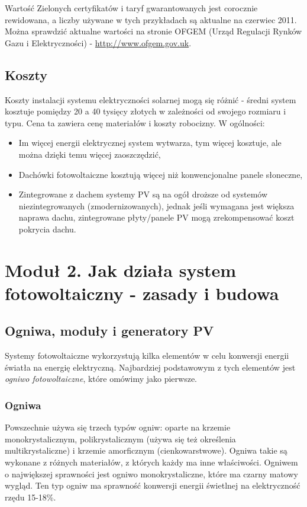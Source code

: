 \documentclass[12pt,a4paper]{article}
\begin{document}
Wartość Zielonych certyfikatów i taryf gwarantowanych jest corocznie 
rewidowana, a liczby używane w tych przykładach są aktualne na czerwiec 
2011. Można sprawdzić aktualne wartości na stronie OFGEM (Urząd 
Regulacji Rynków Gazu i Elektryczności) - \underline{http://www.ofgem.gov.uk}. 

\subsection{Koszty} 
Koszty instalacji systemu elektryczności solarnej mogą 
się różnić - średni system kosztuje pomiędzy 20 a 40 tysięcy złotych w 
zależności od swojego rozmiaru i typu. Cena ta zawiera cenę materiałów i 
koszty robocizny. W ogólności: 

\begin{itemize}
\item Im więcej energii elektrycznej system wytwarza, tym więcej 
kosztuje, ale można dzięki temu więcej zaoszczędzić, 
\item Dachówki fotowoltaiczne kosztują więcej niż konwencjonalne panele 
słoneczne, 
\item Zintegrowane z dachem systemy PV są na ogół droższe od systemów 
niezintegrowanych (zmodernizowanych), jednak jeśli wymagana jest większa naprawa dachu, zintegrowane płyty/panele PV mogą zrekompensować koszt pokrycia dachu.
\end{itemize}

\section{Moduł 2. Jak działa system fotowoltaiczny - zasady i budowa }
\subsection{Ogniwa, moduły i generatory PV}

Systemy fotowoltaiczne wykorzystują kilka elementów w celu konwersji 
energii światła na energię elektryczną. Najbardziej podstawowym z tych 
elementów jest \textit{ogniwo fotowoltaiczne}, które omówimy jako pierwsze. 

\subsubsection{Ogniwa}
Powszechnie używa się trzech typów ogniw: oparte na 
krzemie monokrystalicznym, polikrystalicznym (używa się też określenia 
multikrystaliczne) i krzemie amorficznym (cienkowarstwowe). Ogniwa takie są wykonane z różnych materiałów, z 
których każdy ma inne właściwości. Ogniwem o największej sprawności jest 
ogniwo monokrystaliczne, które ma czarny matowy wygląd. Ten typ ogniw ma 
sprawność konwersji energii świetlnej na elektryczność rzędu 15-18\%. 
\end{document}
